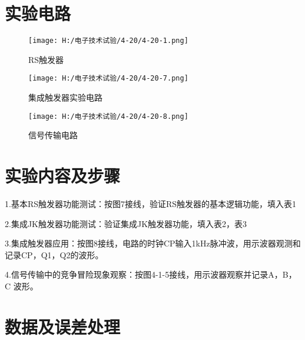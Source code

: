 \documentclass{article}
\begin{document}
\newpage
\section{ 实验电路}
\begin{figure}[h]
    \centering
    \texttt{[image: H:/电子技术试验/4-20/4-20-1.png]}
    \caption{RS触发器 } \label{fig:aa}
  \end{figure}
\begin{figure}[h]
  \centering
  \texttt{[image: H:/电子技术试验/4-20/4-20-7.png]}
  \caption{集成触发器实验电路} \label{fig:aa}
\end{figure}
\begin{figure}[h]
  \centering
  \texttt{[image: H:/电子技术试验/4-20/4-20-8.png]}
  \caption{信号传输电路} \label{fig:aa}
  \end{figure}

\newpage

\section{ 实验内容及步骤}
1.基本RS触发器功能测试：按图7接线，验证RS触发器的基本逻辑功能，填入表1\par
2.集成JK触发器功能测试：验证集成JK触发器功能，填入表2，表3\par
3.集成触发器应用：按图8接线，电路的时钟CP输入1kHz脉冲波，用示波器观测和记录CP，Q1，Q2的波形。\par
4.信号传输中的竞争冒险现象观察：按图4-1-5接线，用示波器观察并记录A，B，C 波形。\par



\section{ 数据及误差处理}
\end{document}
